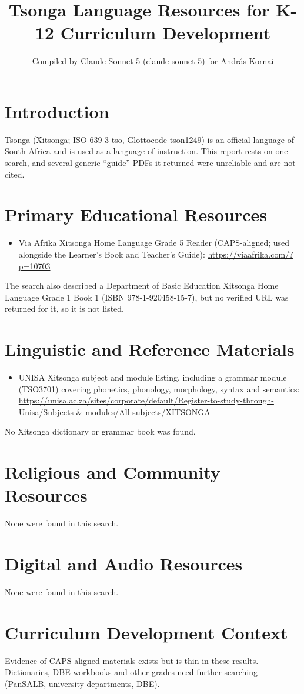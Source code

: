 \documentclass[12pt]{article}
\title{Tsonga Language Resources for K-12 Curriculum Development}
\author{Compiled by Claude Sonnet 5 (claude-sonnet-5) for Andr\'as Kornai}
\date{}
\begin{document}
\maketitle

\section{Introduction}
Tsonga (Xitsonga; ISO 639-3 tso, Glottocode tson1249) is an official language of South Africa and is used as a language of instruction. This report rests on one search, and several generic ``guide'' PDFs it returned were unreliable and are not cited.

\section{Primary Educational Resources}
\begin{itemize}
\item Via Afrika Xitsonga Home Language Grade 5 Reader (CAPS-aligned; used alongside the Learner's Book and Teacher's Guide): \url{https://viaafrika.com/?p=10703}
\end{itemize}
The search also described a Department of Basic Education Xitsonga Home Language Grade 1 Book 1 (ISBN 978-1-920458-15-7), but no verified URL was returned for it, so it is not listed.

\section{Linguistic and Reference Materials}
\begin{itemize}
\item UNISA Xitsonga subject and module listing, including a grammar module (TSO3701) covering phonetics, phonology, morphology, syntax and semantics: \url{https://unisa.ac.za/sites/corporate/default/Register-to-study-through-Unisa/Subjects-&-modules/All-subjects/XITSONGA}
\end{itemize}
No Xitsonga dictionary or grammar book was found.

\section{Religious and Community Resources}
None were found in this search.

\section{Digital and Audio Resources}
None were found in this search.

\section{Curriculum Development Context}
Evidence of CAPS-aligned materials exists but is thin in these results. Dictionaries, DBE workbooks and other grades need further searching (PanSALB, university departments, DBE).
\end{document}
